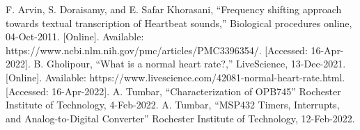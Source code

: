 \documentclass[CMPE]{../KGCOEReport}
\begin{document}
	\begin{thebibliography}{00}
 F. Arvin, S. Doraisamy, and E. Safar Khorasani, “Frequency shifting approach towards textual transcription of Heartbeat sounds,” Biological procedures online, 04-Oct-2011. [Online]. Available: https://www.ncbi.nlm.nih.gov/pmc/articles/PMC3396354/. [Accessed: 16-Apr-2022].
 B. Gholipour, “What is a normal heart rate?,” LiveScience, 13-Dec-2021. [Online]. Available: https://www.livescience.com/42081-normal-heart-rate.html. [Accessed: 16-Apr-2022].
 A. Tumbar, “Characterization of OPB745” Rochester Institute of Technology, 4-Feb-2022.
 A. Tumbar, “MSP432 Timers, Interrupts, and Analog-to-Digital Converter” Rochester Institute of Technology, 12-Feb-2022.
	\end{thebibliography}


\end{document}
